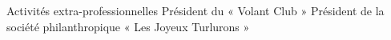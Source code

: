 \begin{rubric}{Activités extra-professionnelles}
\entry*[Association] Président du « Volant Club »
\entry*[Association] Président de la société philanthropique
                     « Les Joyeux Turlurons »
\end{rubric}
